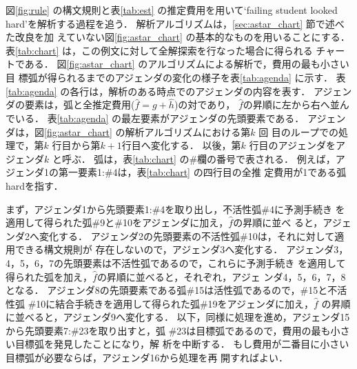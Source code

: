 図\ref{fig:rule} の構文規則と表\ref{tab:est} の推定費用を用いて`failing
student looked hard'を解析する過程を追う．
解析アルゴリズムは，\ref{sec:astar_chart} 節で述べた改良を加
えていない図\ref{fig:astar_chart} の基本的なものを用いることにする． 
表\ref{tab:chart} は，この例文に対して全解探索を行なった場合に得られる
チャートである．
図\ref{fig:astar_chart} のアルゴリズムによる解析で，費用の最も小さい目
標弧が得られるまでのアジェンダの変化の様子を表\ref{tab:agenda} に示す．
表\ref{tab:agenda} の各行は，解析のある時点でのアジェンダの内容を表す．
アジェンダの要素は，弧と全推定費用($\hat{f} = g + \hat{h}$)の対であり，
$\hat{f}$の昇順に左から右へ並んでいる．
表\ref{tab:agenda} の最左要素がアジェンダの先頭要素である．
アジェンダは，図\ref{fig:astar_chart} の解析アルゴリズムにおける第$k$ 回
目のループでの処理で，第$k$ 行目から第$k+1$行目へ変化する．
以後，第$k$ 行目のアジェンダをアジェンダ$k$ と呼ぶ．
弧は，表\ref{tab:chart} の\#欄の番号で表される．
例えば，アジェンダ1の第一要素1:\#4は，表\ref{tab:chart} の四行目の全推
定費用が1である弧hardを指す．

まず，アジェンダ1から先頭要素1:\#4を取り出し，不活性弧\#4に予測手続き
を適用して得られた弧\#9と\#10をアジェンダに加え，$\hat{f}$の昇順に並べ
ると，アジェンダ2へ変化する．
アジェンダ2の先頭要素の不活性弧\#10は，それに対して適用できる構文規則が
存在しないので，アジェンダ3へ変化する．
アジェンダ3，4，5，6，7の先頭要素は不活性弧であるので，これらに予測手続き
を適用して得られた弧を加え，$\hat{f}$の昇順に並べると，それぞれ，アジェ
ンダ4，5，6，7，8となる．
アジェンダ8の先頭要素である弧\#15は活性弧であるので，\#15と不活性弧
\#10に結合手続きを適用して得られた弧\#19をアジェンダに加え，$\hat{f}$
の昇順に並べると，アジェンダ9へ変化する．
以下，同様に処理を進め，アジェンダ15から先頭要素7:\#23を取り出すと，弧
\#23は目標弧であるので，費用の最も小さい目標弧を発見したことになり，解
析を中断する．
もし費用が二番目に小さい目標弧が必要ならば，アジェンダ16から処理を再
開すればよい．

